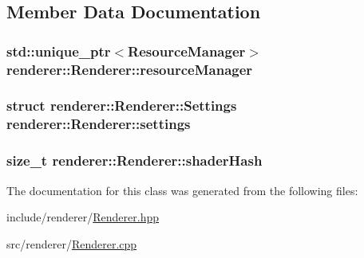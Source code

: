 \subsection{Member Data Documentation}
\hypertarget{classrenderer_1_1Renderer_a34f886fb0da17d81d76b35f7719e836b}{
\subsubsection[{resource\-Manager}]{\setlength{\rightskip}{0pt plus 5cm}std\-::unique\-\_\-ptr$<${\bf Resource\-Manager}$>$ renderer\-::\-Renderer\-::resource\-Manager}}\label{classrenderer_1_1Renderer_a34f886fb0da17d81d76b35f7719e836b}
\hypertarget{classrenderer_1_1Renderer_aaec552b957bd97685f9a3d860966cbf4}{
\subsubsection[{settings}]{\setlength{\rightskip}{0pt plus 5cm}struct {\bf renderer\-::\-Renderer\-::\-Settings}  renderer\-::\-Renderer\-::settings}}\label{classrenderer_1_1Renderer_aaec552b957bd97685f9a3d860966cbf4}
\hypertarget{classrenderer_1_1Renderer_a8e020b5c6fb6e8b217a2732bc601e167}{
\subsubsection[{shader\-Hash}]{\setlength{\rightskip}{0pt plus 5cm}size\-\_\-t renderer\-::\-Renderer\-::shader\-Hash}}\label{classrenderer_1_1Renderer_a8e020b5c6fb6e8b217a2732bc601e167}


The documentation for this class was generated from the following files\-:\begin{DoxyCompactItemize}
\item 
include/renderer/\hyperlink{Renderer_8hpp}{Renderer.\-hpp}\item 
src/renderer/\hyperlink{Renderer_8cpp}{Renderer.\-cpp}\end{DoxyCompactItemize}
